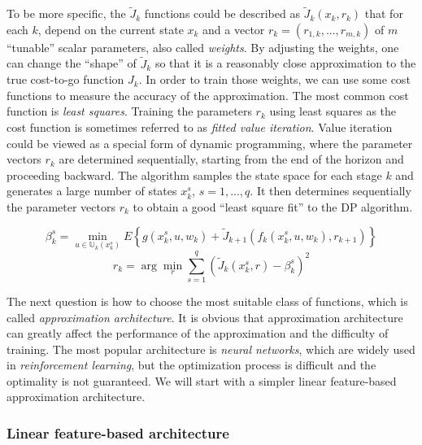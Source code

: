 \documentclass[
]{book}
\theoremstyle{definition}
\theoremstyle{definition}
\theoremstyle{definition}
\theoremstyle{definition}
\theoremstyle{remark}
\begin{document}
To be more specific, the \(\tilde J_k\) functions could be described as \(\tilde J_k (x_k,r_k)\) that for each \(k\), depend on the current state \(x_k\) and a vector \(r_k=(r_{1,k}, ..., r_{m,k})\) of \(m\) ``tunable'' scalar parameters, also called \emph{weights}. By adjusting the weights, one can change the ``shape'' of \(\tilde J_k\) so that it is a reasonably close approximation to the true cost-to-go function \(J_k\).
In order to train those weights, we can use some cost functions to measure the accuracy of the approximation. The most common cost function is \emph{least squares}. Training the parameters \(r_k\) using least squares as the cost function is sometimes referred to as \emph{fitted value iteration}.
Value iteration could be viewed as a special form of dynamic programming, where the parameter vectors \(r_k\) are determined sequentially, starting from the end of the horizon and proceeding backward. The algorithm samples the state space for each stage \(k\) and generates a large number of states \(x_k^s\), \(s=1,...,q\). It then determines sequentially the parameter vectors \(r_k\) to obtain a good ``least square fit'' to the DP algorithm.

\begin{equation}
\beta_k^s=\min_{u \in \mathbb U_k(x_k^s)} E \displaystyle \left\{g(x_k^s,u,w_k) + \tilde J_{k+1} (f_k(x_k^s,u,w_k),r_{k+1}) \right\} \label{eq:apprinv-fvi-1}
\end{equation}
\begin{equation}
r_k = \arg \min_r \sum_{s=1}^q (\tilde J_k(x_k^s,r) - \beta_k^s)^2 \label{eq:apprinv-fvi-2}
\end{equation}

The next question is how to choose the most suitable class of functions, which is called \emph{approximation architecture}. It is obvious that approximation architecture can greatly affect the performance of the approximation and the difficulty of training. The most popular architecture is \emph{neural networks}, which are widely used in \emph{reinforcement learning}, but the optimization process is difficult and the optimality is not guaranteed. We will start with a simpler linear feature-based approximation architecture.

\hypertarget{linear-feature-based-architecture}{%
\subsubsection{Linear feature-based architecture}\label{linear-feature-based-architecture}}
\end{document}
